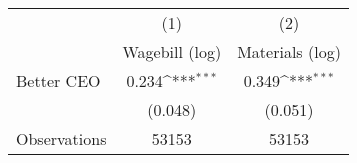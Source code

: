 {
\def\sym#1{\ifmmode^{#1}\else\(^{#1}\)\fi}
\begin{tabular}{l*{2}{c}}
\hline\hline
                    &\multicolumn{1}{c}{(1)}&\multicolumn{1}{c}{(2)}\\
                    &\multicolumn{1}{c}{Wagebill (log)}&\multicolumn{1}{c}{Materials (log)}\\
\hline
Better CEO          &       0.234\sym{***}&       0.349\sym{***}\\
                    &     (0.048)         &     (0.051)         \\
\hline
Observations        &       53153         &       53153         \\
\hline\hline
\end{tabular}
}
